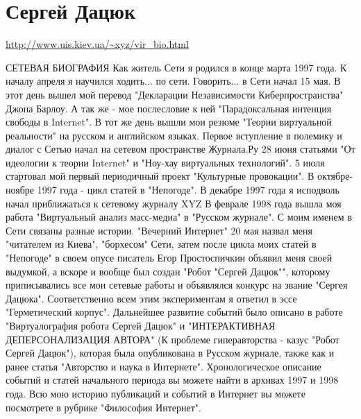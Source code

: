  
 
 
 
 
\section{Сергей Дацюк}

\url{http://www.uis.kiev.ua/~xyz/vir_bio.html}

СЕТЕВАЯ БИОГРАФИЯ
Как житель Сети я родился в конце марта 1997 года. К началу апреля я научился ходить... по сети. Говорить... в Сети начал 15 мая. В этот день вышел мой перевод "Декларации Независимости Киберпространства" Джона Барлоу. А так же - мое послесловие к ней "Парадоксальная интенция свободы в Internet". В тот же день вышли мои резюме "Теории виртуальной реальности" на русском и английском языках.
Первое вступление в полемику и диалог с Сетью начал на сетевом пространстве Журнала.Ру 28 июня статьями "От идеологии к теории Internet" и "Ноу-хау виртуальных технологий".
5 июля стартовал мой первый периодичный проект "Культурные провокации".
В октябре-ноябре 1997 года - цикл статей в "Непогоде".
В декабре 1997 года я исподволь начал приближаться к сетевому журналу XYZ
В феврале 1998 года вышла моя работа "Виртуальный анализ масс-медиа" в "Русском журнале".
С моим именем в Сети связаны разные истории. "Вечерний Интернет" 20 мая назвал меня "читателем из Киева", "борхесом" Сети, затем после цикла моих статей в "Непогоде" в своем опусе писатель Егор Простоспичкин объявил меня своей выдумкой, а вскоре и вообще был создан "Робот "Сергей Дацюк"", которому приписывались все мои сетевые работы и объявлялся конкурс на звание "Сергея Дацюка". Соответственно всем этим экспериментам я ответил в эссе "Герметический корпус". Дальнейшее развитие событий было описано в работе "Виртуалография робота Сергей Дацюк" и "ИНТЕРАКТИВНАЯ ДЕПЕРСОНАЛИЗАЦИЯ АВТОРА" (К проблеме гиперавторства - казус "Робот Сергей Дацюк"), которая была опубликована в Русском журнале, также как и ранее статья "Авторство и наука в Интернете".
Хронологическое описание событий и статей начального периода вы можете найти в архивах 1997 и 1998 года.
Всю мою историю публикаций и событий в Интернет вы можете посмотрете в рубрике "Философия Интернет".
